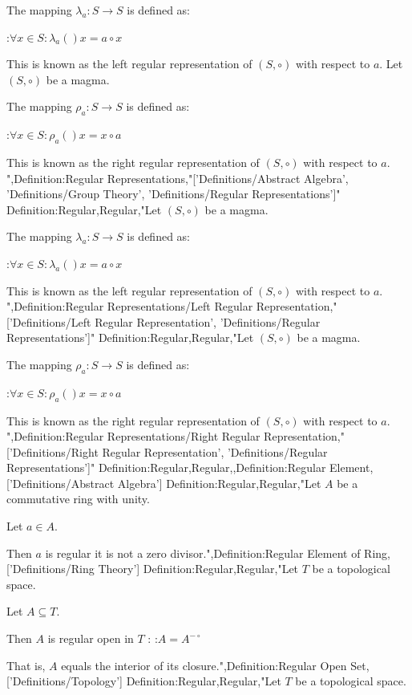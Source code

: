 The mapping $\lambda_a: S \to S$ is defined as:

:$\forall x \in S: \lambda_a \left(   \right)x = a \circ x$


This is known as the left regular representation of $\left( S, \circ \right)$ with respect to $a$.
Let $\left( S, \circ \right)$ be a magma.

The mapping $\rho_a: S \to S$ is defined as:

:$\forall x \in S: \rho_a \left(   \right)x = x \circ a$


This is known as the right regular representation of $\left( S, \circ \right)$ with respect to $a$.
",Definition:Regular Representations,"['Definitions/Abstract Algebra', 'Definitions/Group Theory', 'Definitions/Regular Representations']"
Definition:Regular,Regular,"Let $\left( S, \circ \right)$ be a magma.

The mapping $\lambda_a: S \to S$ is defined as:

:$\forall x \in S: \lambda_a \left(   \right)x = a \circ x$


This is known as the left regular representation of $\left( S, \circ \right)$ with respect to $a$.
",Definition:Regular Representations/Left Regular Representation,"['Definitions/Left Regular Representation', 'Definitions/Regular Representations']"
Definition:Regular,Regular,"Let $\left( S, \circ \right)$ be a magma.

The mapping $\rho_a: S \to S$ is defined as:

:$\forall x \in S: \rho_a \left(   \right)x = x \circ a$


This is known as the right regular representation of $\left( S, \circ \right)$ with respect to $a$.
",Definition:Regular Representations/Right Regular Representation,"['Definitions/Right Regular Representation', 'Definitions/Regular Representations']"
Definition:Regular,Regular,,Definition:Regular Element,['Definitions/Abstract Algebra']
Definition:Regular,Regular,"Let $A$ be a commutative ring with unity.

Let $a \in A$.


Then $a$ is regular  it is not a zero divisor.",Definition:Regular Element of Ring,['Definitions/Ring Theory']
Definition:Regular,Regular,"Let $T$ be a topological space.

Let $A \subseteq T$.


Then $A$ is regular open in $T$ :
:$A = A^{- \circ}$

That is,  $A$ equals the interior of its closure.",Definition:Regular Open Set,['Definitions/Topology']
Definition:Regular,Regular,"Let $T$ be a topological space.

